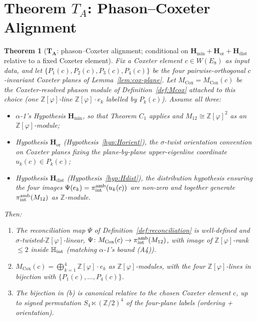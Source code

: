 \documentclass[11pt, a4paper]{amsart}
\newtheorem{theorem}{Theorem}[section]
\theoremstyle{definition}
\newcommand{\Z}{\mathbb{Z}}
\newcommand{\HH}{\mathbb{H}}
\newcommand{\Hmin}{\mathbf{H}_{\min}}
\newcommand{\Hor}{\mathbf{H}_{\mathrm{or}}}
\newcommand{\Hdist}{\mathbf{H}_{\mathrm{dist}}}
\newcommand{\Ophi}{\mathbb{Z}[\varphi]}
\newcommand{\Mcox}{M_{\mathrm{Cox}}}
\newcommand{\Mtw}{M_{12}}
\begin{document}
\section{Theorem $T_A$: Phason--Coxeter Alignment}
\label{sec:TA}

\begin{theorem}[$\mathbf{T_A}$: phason--Coxeter alignment;
  conditional on $\Hmin + \Hor + \Hdist$ relative to a fixed
  Coxeter element]
\label{thm:TA}
Fix a Coxeter element $c \in W(E_8)$ as input data, and let
$\{P_1(c), P_2(c), P_3(c), P_4(c)\}$ be the four
pairwise-orthogonal $c$-invariant Coxeter planes of
Lemma~\ref{lem:cox-plane}. Let $\Mcox = \Mcox(c)$ be the
Coxeter-resolved phason module of Definition~\ref{def:Mcox}
attached to this choice (one $\Ophi$-line $\Ophi \cdot e_k$
labelled by $P_k(c)$). Assume all three:
\begin{itemize}
\item $\alpha$-1's Hypothesis $\Hmin$, so that Theorem $C_1$
  applies and $\Mtw \cong \Ophi^{2}$ as an $\Ophi$-module;
\item Hypothesis $\Hor$ (Hypothesis~\ref{hyp:Horient}), the
  $\sigma$-twist orientation convention on Coxeter planes
  fixing the plane-by-plane upper-eigenline coordinate
  $u_k(c) \in P_k(c)$;
\item Hypothesis $\Hdist$ (Hypothesis~\ref{hyp:Hdist}), the
  distribution hypothesis ensuring the four images
  $\Psi(e_k) = \pi_{\rm int}^{\rm amb}(u_k(c))$ are non-zero
  and together generate $\pi_{\rm int}^{\rm amb}(\Mtw)$ as
  $\Z$-module.
\end{itemize}
Then:
\begin{enumerate}
\item[\textup{(a)}] The reconciliation map $\Psi$ of
  Definition~\ref{def:reconciliation} is well-defined and
  $\sigma$-twisted-$\Ophi$-linear, $\Psi \colon \Mcox(c) \to
  \pi_{\rm int}^{\rm amb}(\Mtw)$, with image of $\Ophi$-rank
  $\leq 2$ inside $\HH_{\rm int}$ (matching $\alpha$-1's
  bound (A4)).
\item[\textup{(b)}] $\Mcox(c) = \bigoplus_{k=1}^{4} \Ophi
  \cdot e_k$ as $\Ophi$-modules, with the four $\Ophi$-lines
  in bijection with $\{P_1(c), \ldots, P_4(c)\}$.
\item[\textup{(c)}] The bijection in (b) is canonical
  \emph{relative to the chosen Coxeter element $c$}, up to
  signed permutation $S_4 \ltimes (\Z/2)^4$ of the
  four-plane labels (ordering + orientation).
\end{enumerate}
\end{theorem}
\end{document}
